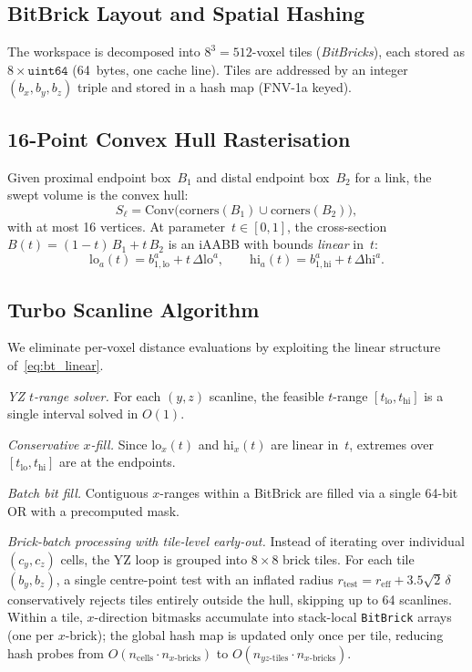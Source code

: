 \documentclass[journal]{IEEEtran}
\begin{document}
\subsection{BitBrick Layout and Spatial Hashing}\label{sec:bitbrick}

The workspace is decomposed into $8^3{=}512$-voxel tiles
(\emph{BitBricks}), each stored as $8{\times}\mathtt{uint64}$
(64~bytes, one cache line).
Tiles are addressed by an integer $(b_x,b_y,b_z)$ triple
and stored in a hash map (FNV-1a keyed).

\subsection{16-Point Convex Hull Rasterisation}\label{sec:hull16}

Given proximal endpoint box~$B_1$ and distal endpoint box~$B_2$
for a link, the swept volume is the convex hull:
\begin{equation}\label{eq:hull16}
  S_\ell = \mathrm{Conv}\bigl(
    \mathrm{corners}(B_1) \cup \mathrm{corners}(B_2)
  \bigr),
\end{equation}
with at most 16 vertices.
At parameter~$t \in [0,1]$, the cross-section
$B(t) = (1{-}t)\,B_1 + t\,B_2$ is an iAABB with bounds
\emph{linear} in~$t$:
\begin{equation}\label{eq:bt_linear}
  \mathrm{lo}_a(t) = b_{1,\mathrm{lo}}^a + t\,\Delta\mathrm{lo}^a, \qquad
  \mathrm{hi}_a(t) = b_{1,\mathrm{hi}}^a + t\,\Delta\mathrm{hi}^a.
\end{equation}

\subsection{Turbo Scanline Algorithm}\label{sec:turbo}

We eliminate per-voxel distance evaluations by exploiting the
linear structure of~\eqref{eq:bt_linear}.

\emph{YZ $t$-range solver.}
For each $(y,z)$ scanline, the feasible $t$-range
$[t_{\mathrm{lo}}, t_{\mathrm{hi}}]$ is a single interval
solved in $O(1)$.

\emph{Conservative $x$-fill.}
Since $\mathrm{lo}_x(t)$ and $\mathrm{hi}_x(t)$ are linear in~$t$,
extremes over $[t_\mathrm{lo}, t_\mathrm{hi}]$ are at the endpoints.

\emph{Batch bit fill.}
Contiguous $x$-ranges within a BitBrick are filled via a single
64-bit OR with a precomputed mask.

\emph{Brick-batch processing with tile-level early-out.}
Instead of iterating over individual $(c_y,c_z)$ cells, the YZ loop
is grouped into $8{\times}8$ brick tiles.
For each tile $(b_y,b_z)$, a single centre-point test with an
inflated radius $r_{\mathrm{test}} = r_{\mathrm{eff}} + 3.5\sqrt{2}\,\delta$
conservatively rejects tiles entirely outside the hull,
skipping up to 64 scanlines.
Within a tile, $x$-direction bitmasks accumulate into stack-local
\texttt{BitBrick} arrays (one per $x$-brick); the global hash map is
updated only once per tile, reducing hash probes from
$O(n_{\mathrm{cells}} \cdot n_{x\text{-bricks}})$ to
$O(n_{yz\text{-tiles}} \cdot n_{x\text{-bricks}})$.
\end{document}
